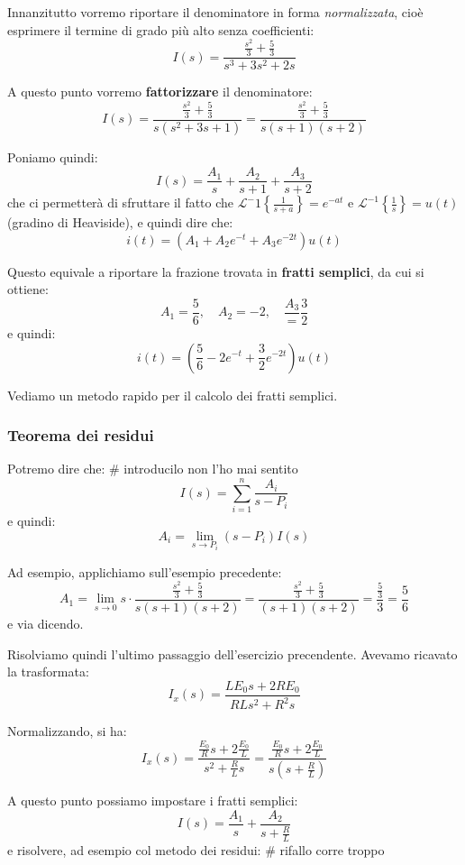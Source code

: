 \documentclass[a4paper,11pt]{article}
\begin{document}
Innanzitutto vorremo riportare il denominatore in forma \textit{normalizzata}, cioè esprimere il termine di grado più alto senza coefficienti:
$$
I(s) = \frac{\frac{s^2}{3} + \frac{5}{3}}{s^3 + 3s^2 + 2s}
$$

A questo punto vorremo \textbf{fattorizzare} il denominatore:
$$
I(s) = \frac{\frac{s^2}{3} + \frac{5}{3}}{s (s^2 + 3s +1)} = \frac{\frac{s^2}{3} + \frac{5}{3}}{s (s + 1) (s + 2)}
$$

Poniamo quindi:
$$
I(s) = \frac{A_1}{s} + \frac{A_2}{s + 1} + \frac{A_3}{s+2}
$$
che ci permetterà di sfruttare il fatto che $\mathcal{L}^-1\left\{ \frac{1}{s + a} \right\} = e^{-at}$ e $\mathcal{L}^{-1} \left\{ \frac{1}{s} \right\} = u(t)$ (gradino di Heaviside), e quindi dire che:
$$
i(t) = \left( A_1 + A_2 e^{-t} + A_3 e^{-2t} \right) u(t)
$$

Questo equivale a riportare la frazione trovata in \textbf{fratti semplici}, da cui si ottiene:
$$
A_1 = \frac{5}{6}, \quad A_2 = -2, \quad \frac{A_3} = \frac{3}{2} 
$$
e quindi:
$$
i(t) = \left( \frac{5}{6} -2e^{-t} + \frac{3}{2}e^{-2t} \right) u(t)
$$

Vediamo un metodo rapido per il calcolo dei fratti semplici.

\subsubsection{Teorema dei residui}
Potremo dire che: # introducilo non l'ho mai sentito
$$
I(s) = \sum_{i = 1}^n \frac{A_i}{s - P_i}
$$
e quindi:
$$
A_i = \lim_{s \rightarrow P_i} (s - P_i) I(s)
$$

Ad esempio, applichiamo sull'esempio precedente:
$$
A_1 = \lim_{s \rightarrow 0} s \cdot \frac{\frac{s^2}{3} + \frac{5}{3}}{s(s+1)(s+2)}
= \frac{\frac{s^2}{3} + \frac{5}{3}}{(s+1)(s+2)} = \frac{\frac{5}{3}}{3} = \frac{5}{6}
$$
e via dicendo.

\par\smallskip

Risolviamo quindi l'ultimo passaggio dell'esercizio precendente.
Avevamo ricavato la trasformata:
$$
I_x(s) = \frac{L E_0 s + 2 R E_0}{R L s^2 + R^2 s}
$$

Normalizzando, si ha:
$$
I_x(s) = \frac{\frac{E_0}{R} s + 2 \frac{E_0}{L}}{s^2 + \frac{R}{L}s} = \frac{\frac{E_0}{R} s + 2 \frac{E_0}{L}}{s \left(s + \frac{R}{L}\right)}
$$

A questo punto possiamo impostare i fratti semplici:
$$
I(s) = \frac{A_1}{s} + \frac{A_2}{s + \frac{R}{L}}
$$
e risolvere, ad esempio col metodo dei residui:
# rifallo corre troppo
\end{document}
